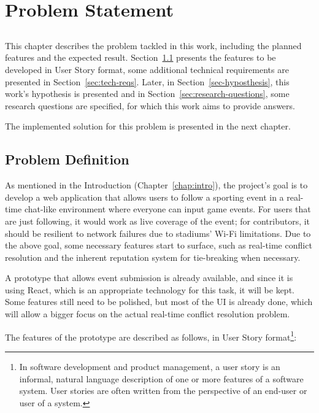 \chapter{Problem Statement}\label{chap:problem}

\section*{}

This chapter describes the problem tackled in this work, including the planned features and the expected result. Section~\ref{sec:prob-def} presents the features to be developed in User Story format, some additional technical requirements are presented in Section~\ref{sec:tech-reqs}. Later, in Section~\ref{sec-hyposthesis}, this work's hypothesis is presented and in Section~\ref{sec:research-questions}, some research questions are specified, for which this work aims to provide answers.

The implemented solution for this problem is presented in the next chapter.  

\section{Problem Definition}\label{sec:prob-def}

As mentioned in the Introduction (Chapter~\ref{chap:intro}), the project's goal is to develop a web application that allows users to follow a sporting event in a real-time chat-like environment where everyone can input game events. For users that are just following, it would work as live coverage of the event; for contributors, it should be resilient to network failures due to stadiums' Wi-Fi limitations.
Due to the above goal, some necessary features start to surface, such as real-time conflict resolution and the inherent reputation system for tie-breaking when necessary. 

A prototype that allows event submission is already available, and since it is using React, which is an appropriate technology for this task, it will be kept. Some features still need to be polished, but most of the UI is already done, which will allow a bigger focus on the actual real-time conflict resolution problem.

The features of the prototype are described as follows, in User Story format\footnote{In software development and product management, a user story is an informal, natural language description of one or more features of a software system. User stories are often written from the perspective of an end-user or user of a system.}:

